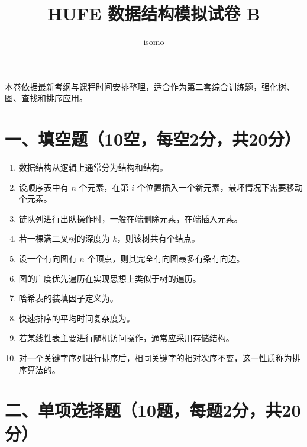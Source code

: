 \documentclass{../../note}
\title{HUFE 数据结构模拟试卷 B}
\author{isomo}
\begin{document}
\fontsize{12pt}{14.4pt}\selectfont
\maketitle

本卷依据最新考纲与课程时间安排整理，适合作为第二套综合训练题，强化树、图、查找和排序应用。

\section*{一、填空题（10空，每空2分，共20分）}

\begin{enumerate}[itemsep=0.8em]
\item 数据结构从逻辑上通常分为\underline{\hspace{2cm}}结构和\underline{\hspace{2cm}}结构。
\item 设顺序表中有 $n$ 个元素，在第 $i$ 个位置插入一个新元素，最坏情况下需要移动\underline{\hspace{2cm}}个元素。
\item 链队列进行出队操作时，一般在\underline{\hspace{2cm}}端删除元素，在\underline{\hspace{2cm}}端插入元素。
\item 若一棵满二叉树的深度为 $k$，则该树共有\underline{\hspace{2cm}}个结点。
\item 设一个有向图有 $n$ 个顶点，则其完全有向图最多有\underline{\hspace{2cm}}条有向边。
\item 图的广度优先遍历在实现思想上类似于树的\underline{\hspace{2cm}}遍历。
\item 哈希表的装填因子定义为\underline{\hspace{2cm}}。
\item 快速排序的平均时间复杂度为\underline{\hspace{2cm}}。
\item 若某线性表主要进行随机访问操作，通常应采用\underline{\hspace{2cm}}存储结构。
\item 对一个关键字序列进行排序后，相同关键字的相对次序不变，这一性质称为排序算法的\underline{\hspace{2cm}}。
\end{enumerate}

\section*{二、单项选择题（10题，每题2分，共20分）}
\end{document}
